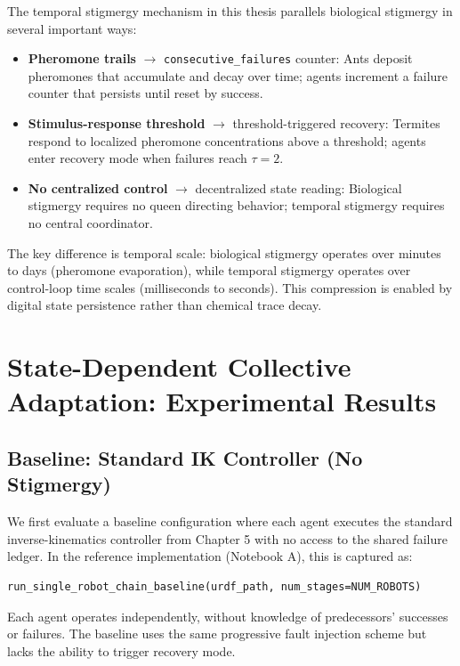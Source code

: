 \documentclass[12pt,a4paper,oneside]{report}
\begin{document}
The temporal stigmergy mechanism in this thesis parallels biological stigmergy in several important ways:

\begin{itemize}
    \item \textbf{Pheromone trails} $\rightarrow$ \texttt{consecutive\_failures} counter: Ants deposit pheromones that accumulate and decay over time; agents increment a failure counter that persists until reset by success.
    \item \textbf{Stimulus-response threshold} $\rightarrow$ threshold-triggered recovery: Termites respond to localized pheromone concentrations above a threshold; agents enter recovery mode when failures reach $\tau = 2$.
    \item \textbf{No centralized control} $\rightarrow$ decentralized state reading: Biological stigmergy requires no queen directing behavior; temporal stigmergy requires no central coordinator.
\end{itemize}

The key difference is temporal scale: biological stigmergy operates over minutes to days (pheromone evaporation), while temporal stigmergy operates over control-loop time scales (milliseconds to seconds). This compression is enabled by digital state persistence rather than chemical trace decay.

\section{State-Dependent Collective Adaptation: Experimental Results}

\subsection{Baseline: Standard IK Controller (No Stigmergy)}

We first evaluate a baseline configuration where each agent executes the standard inverse-kinematics controller from Chapter 5 with no access to the shared failure ledger. In the reference implementation (Notebook A), this is captured as:

{\small
\begin{verbatim}
run_single_robot_chain_baseline(urdf_path, num_stages=NUM_ROBOTS)
\end{verbatim}
}

Each agent operates independently, without knowledge of predecessors' successes or failures. The baseline uses the same progressive fault injection scheme but lacks the ability to trigger recovery mode.
\end{document}
